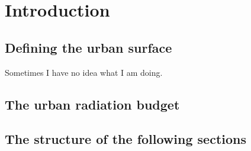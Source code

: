 \chapter{Introduction}
 
\section{Defining the urban surface}
 	Sometimes I have no idea what I am doing.
 	
 \section{The urban radiation budget}
 
 \section{The structure of the following sections}